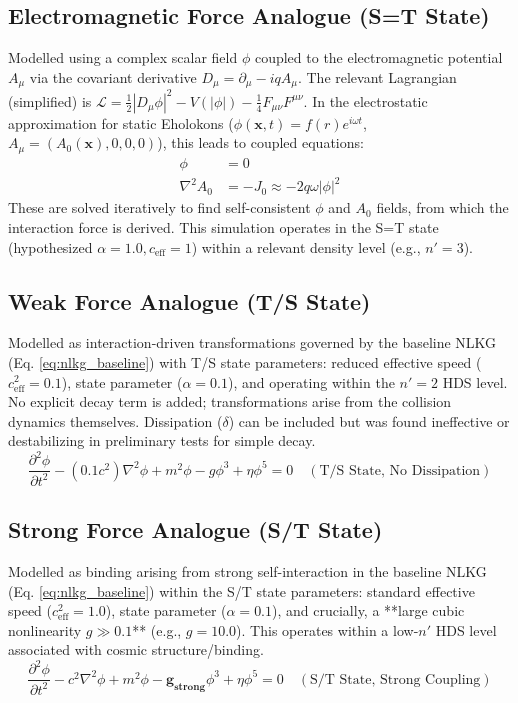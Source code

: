 \documentclass[11pt]{article}
\begin{document}
\subsection{Electromagnetic Force Analogue (S=T State)}
Modelled using a complex scalar field \(\phi\) coupled to the electromagnetic potential \(A_\mu\) via the covariant derivative \(D_\mu = \partial_\mu - i q A_\mu\). The relevant Lagrangian (simplified) is \( \mathcal{L} = \frac{1}{2}|D_\mu \phi|^2 - V(|\phi|) - \frac{1}{4}F_{\mu\nu}F^{\mu\nu} \). In the electrostatic approximation for static Eholokons (\(\phi(\mathbf{x},t) = f(r)e^{i\omega t}\), \(A_\mu = (A_0(\mathbf{x}), 0, 0, 0)\)), this leads to coupled equations:
\begin{align}
[-\nabla^2 + m^2 - g|\phi|^2 + \eta|\phi|^4 - (\omega - qA_0)^2] \phi &= 0 \label{eq:nlkg_static_em} \\
\nabla^2 A_0 &= -J_0 \approx -2q\omega|\phi|^2 \label{eq:poisson}
\end{align}
These are solved iteratively to find self-consistent \(\phi\) and \(A_0\) fields, from which the interaction force is derived. This simulation operates in the S=T state (hypothesized \(\alpha=1.0, c_{\text{eff}}=1\)) within a relevant density level (e.g., \(n'=3\)).

\subsection{Weak Force Analogue (T/S State)}
Modelled as interaction-driven transformations governed by the baseline NLKG (Eq. \ref{eq:nlkg_baseline}) with T/S state parameters: reduced effective speed (\(c_{\text{eff}}^2 = 0.1\)), state parameter (\(\alpha=0.1\)), and operating within the \(n'=2\) HDS level. No explicit decay term is added; transformations arise from the collision dynamics themselves. Dissipation (\(\delta\)) can be included but was found ineffective or destabilizing in preliminary tests for simple decay.
\begin{equation}
\frac{\partial^2 \phi}{\partial t^2} - (0.1 c^2) \nabla^2 \phi + m^2 \phi - g \phi^3 + \eta \phi^5 = 0 \quad (\text{T/S State, No Dissipation})
\label{eq:nlkg_ts}
\end{equation}

\subsection{Strong Force Analogue (S/T State)}
Modelled as binding arising from strong self-interaction in the baseline NLKG (Eq. \ref{eq:nlkg_baseline}) within the S/T state parameters: standard effective speed (\(c_{\text{eff}}^2 = 1.0\)), state parameter (\(\alpha=0.1\)), and crucially, a **large cubic nonlinearity \(g \gg 0.1\)** (e.g., \(g=10.0\)). This operates within a low-\(n'\) HDS level associated with cosmic structure/binding.
\begin{equation}
\frac{\partial^2 \phi}{\partial t^2} - c^2 \nabla^2 \phi + m^2 \phi - \mathbf{g_{\text{strong}}} \phi^3 + \eta \phi^5 = 0 \quad (\text{S/T State, Strong Coupling})
\label{eq:nlkg_st}
\end{equation}
\end{document}
